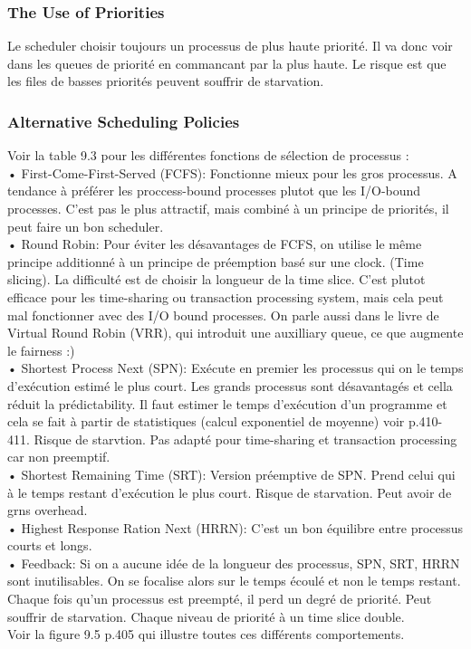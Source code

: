 \subsubsection{The Use of Priorities}
Le scheduler choisir toujours un processus de plus haute priorité. Il va donc voir dans les queues de priorité en commancant par la plus haute. Le risque est que les files de basses priorités peuvent souffrir de starvation.
\subsubsection{Alternative Scheduling Policies}
Voir la table 9.3 pour les différentes fonctions de sélection de processus :\\
• First-Come-First-Served (FCFS): Fonctionne mieux pour les gros processus. A tendance à préférer les proccess-bound processes plutot que les I/O-bound processes. C’est pas le plus attractif, mais combiné à un principe de priorités, il peut faire un bon scheduler.\\
• Round Robin: Pour éviter les désavantages de FCFS, on utilise le même principe additionné à un principe de préemption basé sur une clock. (Time slicing). La difficulté est de choisir la longueur de la time slice. C’est plutot efficace pour les time-sharing ou transaction processing system, mais cela peut mal fonctionner avec des I/O bound processes. On parle aussi dans le livre de Virtual Round Robin (VRR), qui introduit une auxilliary queue, ce que augmente le fairness :)\\
• Shortest Process Next (SPN): Exécute en premier les processus qui on le temps d’exécution estimé le plus court. Les grands processus sont désavantagés et cella réduit la prédictability. Il faut estimer le temps d’exécution d’un programme et cela se fait à partir de statistiques (calcul exponentiel de moyenne) voir p.410-411. Risque de starvtion. Pas adapté pour time-sharing et transaction processing car non preemptif.\\
• Shortest Remaining Time (SRT): Version préemptive de SPN. Prend celui qui à le temps restant d’exécution le plus court. Risque de starvation. Peut avoir de grns overhead.\\
• Highest Response Ration Next (HRRN): C’est un bon équilibre entre processus courts et longs.\\
• Feedback: Si on a aucune idée de la longueur des processus, SPN, SRT, HRRN sont inutilisables. On se focalise alors sur le temps écoulé et non le temps restant. Chaque fois qu’un processus est preempté, il perd un degré de priorité. Peut souffrir de starvation. Chaque niveau de priorité à un time slice double.\\
Voir la figure 9.5 p.405 qui illustre toutes ces différents comportements.
